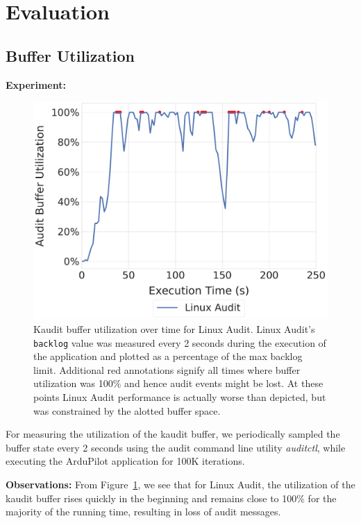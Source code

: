 \section{Evaluation}


\subsection{Buffer Utilization}

\textbf{Experiment:}
\begin{figure}[tbp]
    \centering
    \includegraphics[width=0.9\linewidth,keepaspectratio,scale=0.9]{fig/backlog_over_time_hlight.pdf}
    \caption{\label{fig:eval_backlog}Kaudit buffer utilization over time for Linux Audit. Linux Audit's {\tt backlog} value was measured every 2 seconds during the execution of the application and plotted as a percentage of the max backlog limit.
    Additional red annotations signify all times where buffer utilization was 100\% and hence audit events might be lost. At these points Linux Audit performance is actually worse than depicted, but was constrained by the alotted buffer space.}    
\end{figure}

 For measuring the utilization of the kaudit buffer, we periodically sampled the buffer state every 2 seconds using the audit command line utility \textit{auditctl}, while executing the ArduPilot application for 100K iterations. 

\textbf{Observations:} From Figure~\ref{fig:eval_backlog}, we see that for Linux Audit, the utilization of the kaudit buffer rises quickly in the beginning and remains close to 100\% for the majority of the running time, resulting in loss of audit messages.

